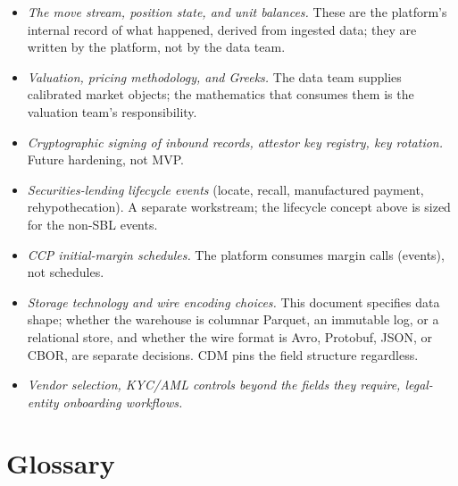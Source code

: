 \documentclass[11pt,a4paper]{article}
\begin{document}
\begin{itemize}
\item \emph{The move stream, position state, and unit balances.} These are the platform's internal record of what happened, derived from ingested data; they are written by the platform, not by the data team.
\item \emph{Valuation, pricing methodology, and Greeks.} The data team supplies calibrated market objects; the mathematics that consumes them is the valuation team's responsibility.
\item \emph{Cryptographic signing of inbound records, attestor key registry, key rotation.} Future hardening, not MVP.
\item \emph{Securities-lending lifecycle events} (locate, recall, manufactured payment, rehypothecation). A separate workstream; the lifecycle concept above is sized for the non-SBL events.
\item \emph{CCP initial-margin schedules.} The platform consumes margin calls (events), not schedules.
\item \emph{Storage technology and wire encoding choices.} This document specifies data shape; whether the warehouse is columnar Parquet, an immutable log, or a relational store, and whether the wire format is Avro, Protobuf, JSON, or CBOR, are separate decisions. CDM pins the field structure regardless.
\item \emph{Vendor selection, KYC/AML controls beyond the fields they require, legal-entity onboarding workflows.}
\end{itemize}

\section{Glossary}
\end{document}
